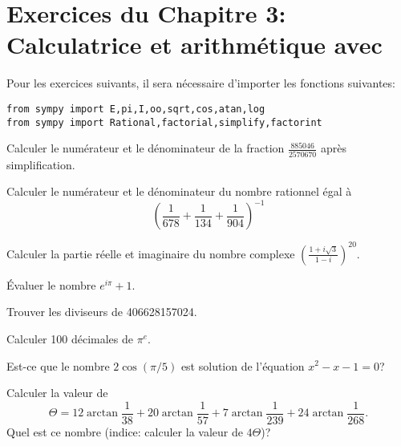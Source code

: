 
\section*{Exercices du Chapitre 3: Calculatrice et arithmétique avec \sympy}

Pour les exercices suivants, il sera nécessaire d'importer les fonctions
suivantes:
\begin{verbatim}
from sympy import E,pi,I,oo,sqrt,cos,atan,log
from sympy import Rational,factorial,simplify,factorint
\end{verbatim}

\begin{exercice}
Calculer le numérateur et le dénominateur de la fraction 
$\displaystyle\frac{885046}{2570670}$ après simplification.
\end{exercice}

\begin{exercice}
Calculer le numérateur et le dénominateur du nombre rationnel égal à
\[
    \left(\frac{1}{678} + \frac{1}{134} + \frac{1}{904}\right)^{-1}
\]
\end{exercice}

\begin{exercice}
Calculer la partie réelle et imaginaire du nombre complexe
$\displaystyle\left(\frac{1+i\sqrt{3}}{1-i}\right)^{20}$.
\end{exercice}

\begin{exercice}
    Évaluer le nombre $e^{i\pi}+1$.
\end{exercice}

\begin{exercice}
    Trouver les diviseurs de 406628157024.
\end{exercice}

\begin{exercice}
Calculer 100 décimales de $\pi^e$.
\end{exercice}

\begin{exercice}
Est-ce que le nombre $2\cos(\pi/5)$ est solution de l'équation $x^2-x-1=0$?
\end{exercice}

\begin{exercice}
    Calculer la valeur de
    \[
	\Theta = 12\arctan\frac{1}{38}+
	         20\arctan\frac{1}{57}+
	          7\arctan\frac{1}{239}+
	      24\arctan\frac{1}{268}.
    \]
    Quel est ce nombre (indice: calculer la valeur de $4\Theta$)?
\end{exercice}

